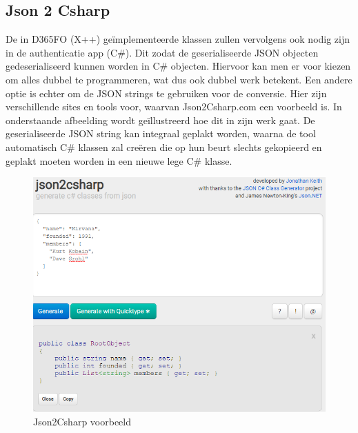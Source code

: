 \subsection{Json 2 Csharp}
De in D365FO (X++) geïmplementeerde klassen zullen vervolgens ook nodig zijn in de authenticatie app (C\#). Dit zodat de geserialiseerde JSON objecten gedeserialiseerd kunnen worden in C\# objecten. Hiervoor kan men er voor kiezen om alles dubbel te programmeren, wat dus ook dubbel werk betekent. Een andere optie is echter om de JSON strings te gebruiken voor de conversie. Hier zijn verschillende sites en tools voor, waarvan Json2Csharp.com een voorbeeld is. 
In onderstaande afbeelding wordt geïllustreerd hoe dit in zijn werk gaat. De geserialiseerde JSON string kan integraal geplakt worden, waarna de tool automatisch C\# klassen zal creëren die op hun beurt slechts gekopieerd en geplakt moeten worden in een nieuwe lege C\# klasse.
\begin{figure}[H]
    \centering
    \includegraphics[width=1\textwidth]{img/json2Csharp.png}
    \caption{Json2Csharp voorbeeld}
\end{figure}

